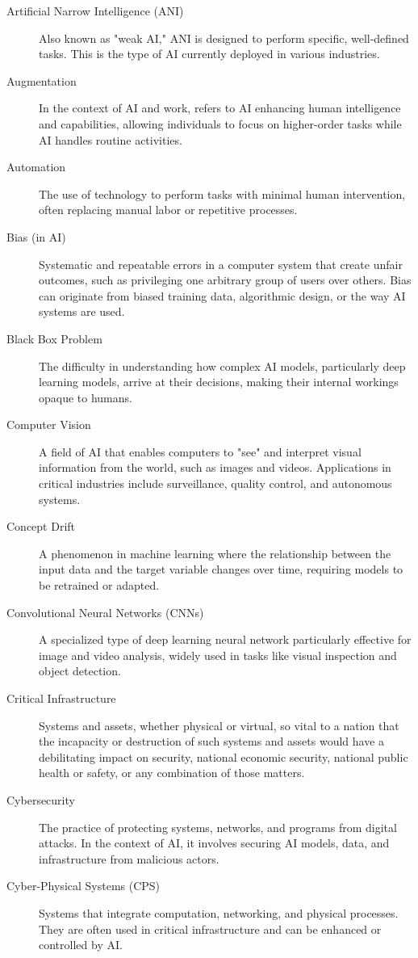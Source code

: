 \begin{description}
    \item[Artificial Narrow Intelligence (ANI)] Also known as "weak AI," ANI is designed to perform specific, well-defined tasks. This is the type of AI currently deployed in various industries.
    \item[Augmentation] In the context of AI and work, refers to AI enhancing human intelligence and capabilities, allowing individuals to focus on higher-order tasks while AI handles routine activities.
    \item[Automation] The use of technology to perform tasks with minimal human intervention, often replacing manual labor or repetitive processes.
    \item[Bias (in AI)] Systematic and repeatable errors in a computer system that create unfair outcomes, such as privileging one arbitrary group of users over others. Bias can originate from biased training data, algorithmic design, or the way AI systems are used.
    \item[Black Box Problem] The difficulty in understanding how complex AI models, particularly deep learning models, arrive at their decisions, making their internal workings opaque to humans.
    \item[Computer Vision] A field of AI that enables computers to "see" and interpret visual information from the world, such as images and videos. Applications in critical industries include surveillance, quality control, and autonomous systems.
    \item[Concept Drift] A phenomenon in machine learning where the relationship between the input data and the target variable changes over time, requiring models to be retrained or adapted.
    \item[Convolutional Neural Networks (CNNs)] A specialized type of deep learning neural network particularly effective for image and video analysis, widely used in tasks like visual inspection and object detection.
    \item[Critical Infrastructure] Systems and assets, whether physical or virtual, so vital to a nation that the incapacity or destruction of such systems and assets would have a debilitating impact on security, national economic security, national public health or safety, or any combination of those matters.
    \item[Cybersecurity] The practice of protecting systems, networks, and programs from digital attacks. In the context of AI, it involves securing AI models, data, and infrastructure from malicious actors.
    \item[Cyber-Physical Systems (CPS)] Systems that integrate computation, networking, and physical processes. They are often used in critical infrastructure and can be enhanced or controlled by AI.

\end{description}
